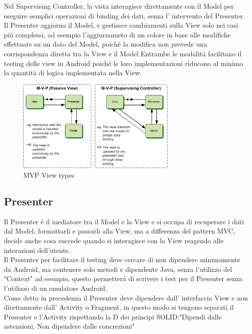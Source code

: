    Nel Supervising Controller, la vista interagisce direttamente con il Model per eseguire semplici operazioni di binding dei dati, senza l' intervento del Presenter. Il Presenter aggiorna il Model, e gestissce cambiamenti sulla View solo nei casi pi\'u complessi, ad esempio l'aggiurnameto di un colore in base alle modifiche effettuate su un dato del Model, poich\'e la modifica non prevede una corrispondenza diretta tra la View e il Model
   Entrambe le modalit\'a facilitano il testing delle view in Android poich\'e le loro implementazioni riducono al minimo la quantità di logica implementata nella View.

   \begin{figure}[!hb]
     \centering
     \includegraphics[width=0.7\textwidth]{immagini/mvp_view_types.png}
     \caption{MVP View types}\label{fig:Model View Types}
   \end{figure}

   \subsection{Presenter}
   Il Presenter \'e il mediatore tra il Model e la View e si occupa di  recuperare i dati dal Model, formattarli e passarli alla View, ma a differenza del pattern MVC, decide anche cosa succede quando si interagisce con la View reagendo alle interazioni dell'utente.\\
   Il Presenter per facilitare il testing deve cercare di non dipendere minimamente da Android, ma contenere solo metodi e dipendente Java, senza l'utilizzo del "Context" ad esempio, questo permetter\'a di scrivere i test per il Presenter senza l'utilizzo di un emulatore Android.\\
   Come detto in precedenza  il Presenter deve dipendere dall' interfaccia View e non direttamente dall' Activity o Fragment, in questo modo si tengono separati il Presenter e l'Activity rispettando la D dei principi SOLID:"Dipendi dalle astensioni. Non dipendere dalle concrezioni"\\










\clearpage{\pagestyle{empty}\cleardoublepage}
